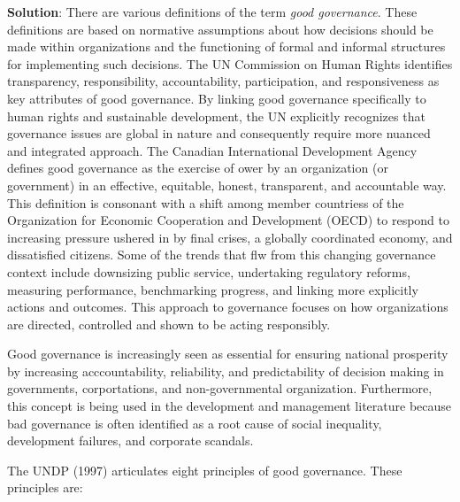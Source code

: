 \documentclass[
]{book}
\newenvironment{solution}{ {\bfseries Solution}:}{}
\begin{document}
\begin{questions}
\begin{solution}
There are various definitions of the term \textit{good governance}. These definitions are based on normative assumptions about how decisions should be made within organizations and the functioning of formal and informal structures for implementing such decisions. The UN Commission on Human Rights identifies transparency, responsibility, accountability, participation, and responsiveness as key attributes of good governance. By linking good governance specifically to human rights and sustainable development, the UN explicitly recognizes that governance issues are global in nature and consequently require more nuanced and integrated approach. The Canadian International Development Agency defines good governance as the exercise of ower by an organization (or government) in an effective, equitable, honest, transparent, and accountable way. This definition is consonant with a shift among member countriess of the Organization for Economic Cooperation and Development (OECD) to respond to increasing pressure ushered in by final crises, a globally coordinated economy, and dissatisfied citizens. Some of the trends that flw from this changing governance context include downsizing public service, undertaking regulatory reforms, measuring performance, benchmarking progress, and linking more explicitly actions and outcomes. This approach to governance focuses on how organizations are directed, controlled and shown to be acting responsibly.

Good governance is increasingly seen as essential for ensuring national prosperity by increasing acccountability, reliability, and predictability of decision making in governments, corportations, and non-governmental organization. Furthermore, this concept is being used in the development and management literature because bad governance is often identified as a root cause of social inequality, development failures, and corporate scandals.

The UNDP (1997) articulates eight principles of good governance. These principles are:


\end{solution}
\end{questions}
\end{document}
